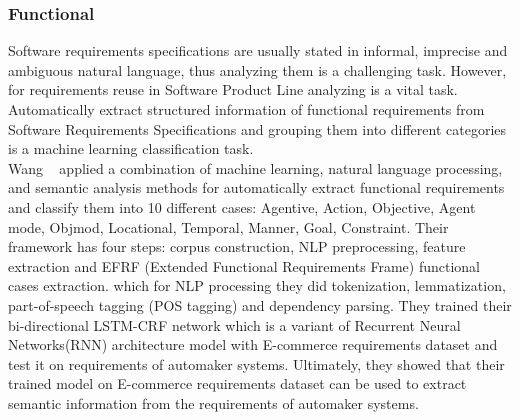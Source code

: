 \subsubsection{Functional}

Software requirements specifications are usually stated in informal, imprecise
and ambiguous natural language, thus analyzing them is a challenging task.
However, for requirements reuse in Software Product Line analyzing is a vital
task. Automatically extract structured information of functional requirements
from Software Requirements Specifications and grouping them into different
categories is a machine learning classification task\cite{7949577}. \\

Wang \etal~\cite{7949577} applied a combination of machine learning, natural
language processing, and semantic analysis methods for automatically extract functional requirements and classify
them into 10 different cases: Agentive, Action, Objective, Agent mode, Objmod, Locational, Temporal, Manner, Goal,
Constraint. Their framework has four steps: corpus construction,  NLP 
preprocessing, feature extraction and  EFRF (Extended Functional Requirements
Frame) functional cases extraction. which for NLP processing they did
tokenization,   lemmatization, part-of-speech tagging (POS  tagging) and
dependency parsing. They trained their bi-directional LSTM-CRF network which is
a variant of Recurrent Neural Networks(RNN) architecture model with E-commerce
requirements dataset and test it on requirements of automaker systems.
Ultimately, they showed that their trained model on E-commerce requirements
dataset can be used to extract semantic information from the requirements of
automaker systems.

